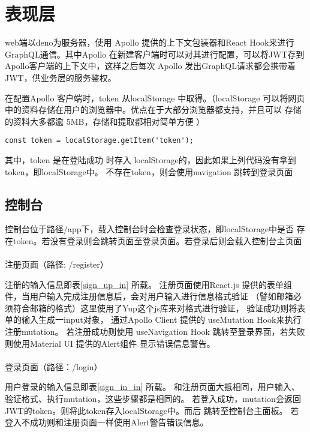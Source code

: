 \section{表现层}
web端以deno为服务器，使用 Apollo 提供的上下文包装器和React Hook来进行
GraphQL通信。其中Apollo 在新建客户端时可以对其进行配置，可以将JWT存到
Apollo客户端的上下文中，这样之后每次 Apollo 发出GraphQL请求都会携带着
JWT，供业务层的服务鉴权。

在配置Apollo 客户端时，token 从localStorage 中取得。（localStorage 可以将网页中的资料存储在用户的浏览器中。优点在于大部分浏览器都支持，并且可以
存储的资料大多都逾 5MB，存储和提取都相对简单方便 \cite{casario2011html5}）

\begin{lstlisting}
const token = localStorage.getItem('token');
\end{lstlisting}

其中，token 是在登陆成功
时存入 localStorage的，因此如果上列代码没有拿到token，即localStorage中。
不存在token，则会使用navigation 跳转到登录页面

\subsection{控制台}
控制台位于路径/app下，载入控制台时会检查登录状态，即localStorage中是否
存在token。若没有登录则会跳转页面至登录页面。若登录后则会载入控制台主页面

\paragraph{} 注册页面（路径: /register）

注册的输入信息即表\ref{sign_up_in} 所载。
注册页面使用React.js 提供的表单组件，当用户输入完成注册信息后，会对用户输入进行信息格式验证
（譬如邮箱必须符合邮箱的格式）这里使用了Yup这个js库来对格式进行验证，
验证成功则将表单的输入生成一input对象，
通过Apollo Client 提供的 useMutation Hook来执行注册mutation。
若注册成功则使用 useNavigation Hook 跳转至登录界面，若失败则使用Material UI 提供的Alert组件
显示错误信息警告。

\paragraph{} 登录页面（路径：/login）


用户登录的输入信息即表\ref{sign_in_in} 所载。
和注册页面大抵相同，用户输入、验证格式、执行mutation，这些步骤都是相同的。
若登入成功，mutation会返回JWT的token。则将此token存入localStorage中。而后
跳转至控制台主面板。
若登入不成功则和注册页面一样使用Alert警告错误信息。

